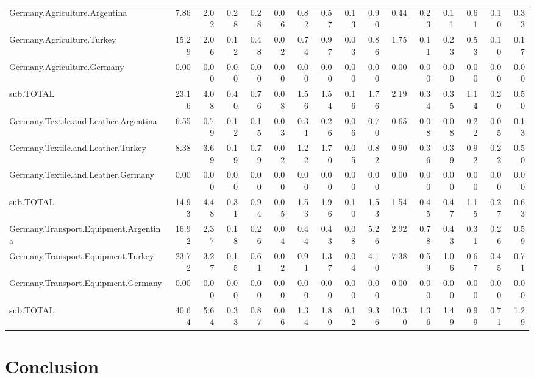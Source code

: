 \documentclass[a4paper]{article}\usepackage[]{graphicx}\usepackage[]{color}
\begin{document}
\begin{sidewaystable}[htbp]
\begin{tabular}{lrrrrrrrrrrrrrrr}
    Germany.Agriculture.Argentina & 7.86  & 2.02  & 0.28  & 0.28  & 0.06  & 0.82  & 0.57  & 0.13  & 0.90  & 0.44  & 0.23  & 0.11  & 0.61  & 0.10  & 0.33 \\
    Germany.Agriculture.Turkey & 15.29 & 2.06  & 0.12  & 0.48  & 0.02  & 0.74  & 0.97  & 0.03  & 0.86  & 1.75  & 0.11  & 0.23  & 0.53  & 0.10  & 0.17 \\
    Germany.Agriculture.Germany & 0.00  & 0.00  & 0.00  & 0.00  & 0.00  & 0.00  & 0.00  & 0.00  & 0.00  & 0.00  & 0.00  & 0.00  & 0.00  & 0.00  & 0.00 \\
    sub.TOTAL & 23.16 & 4.08  & 0.40  & 0.76  & 0.08  & 1.56  & 1.54  & 0.16  & 1.76  & 2.19  & 0.34  & 0.35  & 1.14  & 0.20  & 0.50 \\
    Germany.Textile.and.Leather.Argentina & 6.55  & 0.79  & 0.12  & 0.15  & 0.03  & 0.31  & 0.26  & 0.06  & 0.70  & 0.65  & 0.08  & 0.08  & 0.22  & 0.05  & 0.13 \\
    Germany.Textile.and.Leather.Turkey & 8.38  & 3.69  & 0.19  & 0.79  & 0.02  & 1.22  & 1.70  & 0.05  & 0.82  & 0.90  & 0.36  & 0.39  & 0.92  & 0.22  & 0.50 \\
    Germany.Textile.and.Leather.Germany & 0.00  & 0.00  & 0.00  & 0.00  & 0.00  & 0.00  & 0.00  & 0.00  & 0.00  & 0.00  & 0.00  & 0.00  & 0.00  & 0.00  & 0.00 \\
    sub.TOTAL & 14.93 & 4.48  & 0.31  & 0.94  & 0.05  & 1.53  & 1.96  & 0.10  & 1.53  & 1.54  & 0.45  & 0.47  & 1.15  & 0.27  & 0.63 \\
    Germany.Transport.Equipment.Argentina & 16.92 & 2.37  & 0.18  & 0.26  & 0.04  & 0.44  & 0.43  & 0.08  & 5.26  & 2.92  & 0.78  & 0.43  & 0.31  & 0.26  & 0.59 \\
    Germany.Transport.Equipment.Turkey & 23.72 & 3.27  & 0.15  & 0.61  & 0.02  & 0.91  & 1.37  & 0.04  & 4.10  & 7.38  & 0.59  & 1.06  & 0.67  & 0.45  & 0.71 \\
    Germany.Transport.Equipment.Germany & 0.00  & 0.00  & 0.00  & 0.00  & 0.00  & 0.00  & 0.00  & 0.00  & 0.00  & 0.00  & 0.00  & 0.00  & 0.00  & 0.00  & 0.00 \\
    sub.TOTAL & 40.64 & 5.64  & 0.33  & 0.87  & 0.06  & 1.34  & 1.80  & 0.12  & 9.36  & 10.30 & 1.36  & 1.49  & 0.99  & 0.71  & 1.29 \\
    \bottomrule
    \end{tabular}
\end{sidewaystable}

\section{Conclusion}
\label{sec:conclusion}
\end{document}
